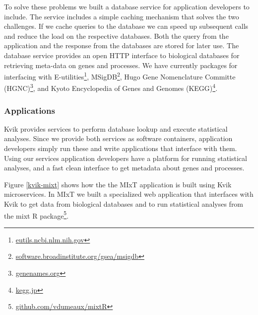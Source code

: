 To solve these problems we built a database service for application developers
to include. The service includes a simple caching mechanism that solves the two
challenges. If we cache queries to the database we can speed up subsequent calls
and reduce the load on the respective databases. Both the query from the
application and the response from the databases are stored for later use.
The database service provides an open HTTP interface to biological databases for
retrieving meta-data on genes and processes. We have currently packages for
interfacing with E-utilities\footnote{\url{eutils.ncbi.nlm.nih.gov}},
MSigDB\footnote{\url{software.broadinstitute.org/gsea/msigdb}}, Hugo Gene
Nomenclature Committe (HGNC)\footnote{\url{genenames.org}}, and Kyoto
Encyclopedia of Genes and Genomes (KEGG)\footnote{\url{kegg.jp}}. 


\subsubsection*{Applications} 
Kvik provides services to perform database lookup and execute statistical
analyses. Since we provide both services as software containers, application
developers simply run these and write applications that interface with them.
Using our services application developers have a platform for running
statistical analyses, and a fast clean interface to get metadata about genes and
processes. 

Figure \ref{kvik-mixt} shows how the the MIxT application is built using Kvik
microservices. In MIxT we built a specialized web application that interfaces
with Kvik to get data from biological databases and to run statistical analyses
from the mixt R package\footnote{\url{github.com/vdumeaux/mixtR}}. 

